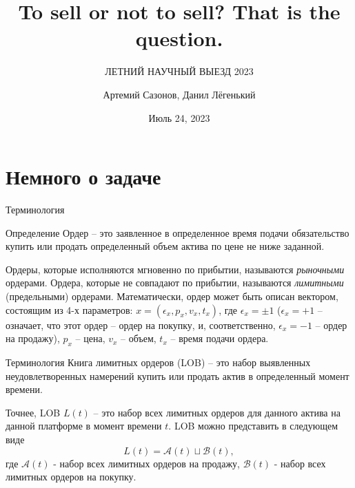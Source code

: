 \documentclass[aspectratio=169]{beamer}
\subtitle{ЛЕТНИЙ НАУЧНЫЙ ВЫЕЗД 2023}
\title{To sell or not to sell? That is the question.}
\author{Артемий Сазонов, Данил Лёгенький}
\institute{Механико-математический факультет МГУ имени М.В. Ломоносова}
\date{Июль 24, 2023}
\begin{document}
    \maketitle

    \section{Немного о задаче}
    
        \begin{frame}{Терминология}
        \begin{block}{Определение}
            Ордер -- это заявленное в определенное время подачи обязательство купить или продать определенный объем актива по цене не ниже заданной.
        \end{block}
            Ордеры, которые исполняются мгновенно по прибытии, называются \emph{рыночными} ордерами. Ордера, которые не совпадают по прибытии, называются \emph{лимитными} 
            (предельными) ордерами. Математически, ордер может быть описан вектором, состоящим из 4-х параметров: $x = (\epsilon_x, p_x, v_x, t_x) $, где 
            $\epsilon_x = \pm 1 $ ($\epsilon_x = + 1$ -- означает, что этот ордер -- ордер на покупку, и, соответственно, $\epsilon_x = - 1$ -- ордер 
            на продажу), $p_x$ -- цена, $v_x$ -- объем, $t_x$ -- время подачи ордера.
        \end{frame}
        
        \begin{frame}{Терминология}
            Книга лимитных ордеров (LOB) -- это  
            набор выявленных неудовлетворенных намерений купить или продать актив в определенный момент времени.

            Точнее, LOB $L(t)$ -- это набор всех лимитных ордеров для данного актива на данной платформе в момент времени $t$.   
            LOB можно представить в следующем виде
            \begin{equation*}
                L(t) = \mathcal{A}(t) \sqcup \mathcal{B}(t),
            \end{equation*}
            где $\mathcal{A}(t)$ - набор всех лимитных ордеров на продажу, $\mathcal{B}(t)$ - набор всех лимитных ордеров на покупку. 
        \end{frame}
\end{document}
